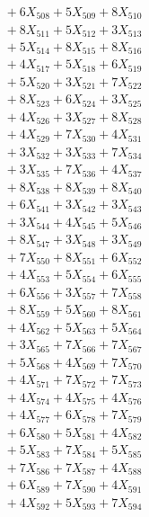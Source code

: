 \documentclass[a4paper,10pt]{article}
\begin{document}
{\begin{align}
&\;  + 6 X_{508} + 5 X_{509} + 8 X_{510} \\[0.3ex]
&\;  + 8 X_{511} + 5 X_{512} + 3 X_{513} \\[0.3ex]
&\;  + 5 X_{514} + 8 X_{515} + 8 X_{516} \\[0.3ex]
&\;  + 4 X_{517} + 5 X_{518} + 6 X_{519} \\[0.5ex]\allowbreak
&\;  + 5 X_{520} + 3 X_{521} + 7 X_{522} \\[0.3ex]
&\;  + 8 X_{523} + 6 X_{524} + 3 X_{525} \\[0.3ex]
&\;  + 4 X_{526} + 3 X_{527} + 8 X_{528} \\[0.3ex]
&\;  + 4 X_{529} + 7 X_{530} + 4 X_{531} \\[0.3ex]
&\;  + 3 X_{532} + 3 X_{533} + 7 X_{534} \\[0.3ex]
&\;  + 3 X_{535} + 7 X_{536} + 4 X_{537} \\[0.3ex]
&\;  + 8 X_{538} + 8 X_{539} + 8 X_{540} \\[0.3ex]
&\;  + 6 X_{541} + 3 X_{542} + 3 X_{543} \\[0.3ex]
&\;  + 3 X_{544} + 4 X_{545} + 5 X_{546} \\[0.3ex]
&\;  + 8 X_{547} + 3 X_{548} + 3 X_{549} \\[0.5ex]\allowbreak
&\;  + 7 X_{550} + 8 X_{551} + 6 X_{552} \\[0.3ex]
&\;  + 4 X_{553} + 5 X_{554} + 6 X_{555} \\[0.3ex]
&\;  + 6 X_{556} + 3 X_{557} + 7 X_{558} \\[0.3ex]
&\;  + 8 X_{559} + 5 X_{560} + 8 X_{561} \\[0.3ex]
&\;  + 4 X_{562} + 5 X_{563} + 5 X_{564} \\[0.3ex]
&\;  + 3 X_{565} + 7 X_{566} + 7 X_{567} \\[0.3ex]
&\;  + 5 X_{568} + 4 X_{569} + 7 X_{570} \\[0.3ex]
&\;  + 4 X_{571} + 7 X_{572} + 7 X_{573} \\[0.3ex]
&\;  + 4 X_{574} + 4 X_{575} + 4 X_{576} \\[0.3ex]
&\;  + 4 X_{577} + 6 X_{578} + 7 X_{579} \\[0.5ex]\allowbreak
&\;  + 6 X_{580} + 5 X_{581} + 4 X_{582} \\[0.3ex]
&\;  + 5 X_{583} + 7 X_{584} + 5 X_{585} \\[0.3ex]
&\;  + 7 X_{586} + 7 X_{587} + 4 X_{588} \\[0.3ex]
&\;  + 6 X_{589} + 7 X_{590} + 4 X_{591} \\[0.3ex]
&\;  + 4 X_{592} + 5 X_{593} + 7 X_{594} \\[0.3ex]

\end{align}}
\end{document}
